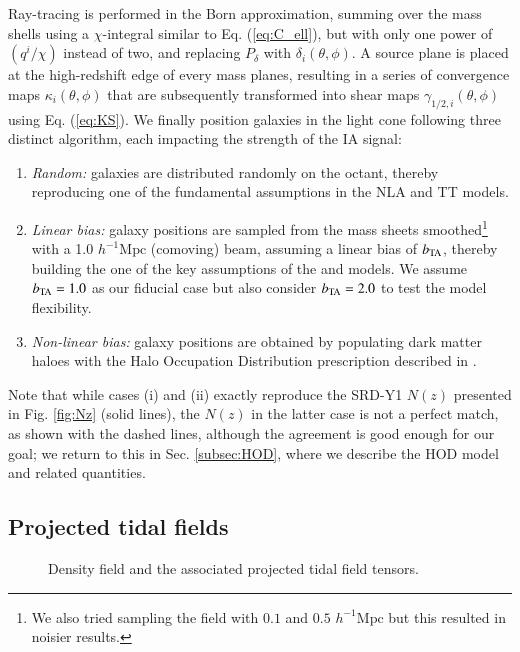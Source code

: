 Ray-tracing is performed in the Born approximation, summing over the mass shells using a $\chi$-integral similar to Eq. (\ref{eq:C_ell}), but with only one power of $(q^i/\chi)$ instead of two, and replacing $P_\delta$ with $\delta_i(\theta,\phi)$.
A source plane is placed at the high-redshift edge of every mass planes, resulting in a series of convergence  maps $\kappa_i(\theta,\phi)$ that are subsequently transformed into shear maps $\gamma_{1/2, i}(\theta,\phi)$ using Eq. (\ref{eq:KS}).
We finally position galaxies in the light cone following three distinct algorithm, each impacting the strength of the IA signal:
\begin{enumerate}
\item {\it Random:} galaxies are distributed randomly on the octant, thereby reproducing one of the  fundamental assumptions in the NLA and TT models. 
\item {\it Linear bias:} galaxy positions are sampled from the mass sheets smoothed\footnote{We also tried sampling the field with $0.1$ and $0.5$ $h^{-1}\mathrm{Mpc}$ but this resulted in noisier results.} with a 1.0 $h^{-1}\mathrm{Mpc}$ (comoving) beam, assuming a linear bias of $b_{\rm TA}$, thereby building the one of the key assumptions of the \dNLA and \dTT models. 
We assume $b_{\rm TA}=1.0$ as our fiducial case but also consider $b_{\rm TA}=2.0$ to test  the  model flexibility. 
\item{\it Non-linear bias:} galaxy positions are obtained by populating dark matter haloes with the Halo Occupation Distribution prescription described in \citet{cosmoDC2}. 
\end{enumerate}
Note that while cases (i) and (ii) exactly reproduce the SRD-Y1 $N(z)$ presented in Fig. \ref{fig:Nz} (solid lines), the $N(z)$ in the latter case is not a perfect match, as shown with the dashed lines, although the agreement is good enough for our goal; we return to this in Sec. \ref{subsec:HOD}, where we describe the HOD model and related quantities.  


\subsection{Projected tidal fields}
\label{subsec:IA_sims}

\begin{figure*}
\caption{Density field and the associated projected tidal field tensors.}
\label{fig:maps}
\end{figure*}

